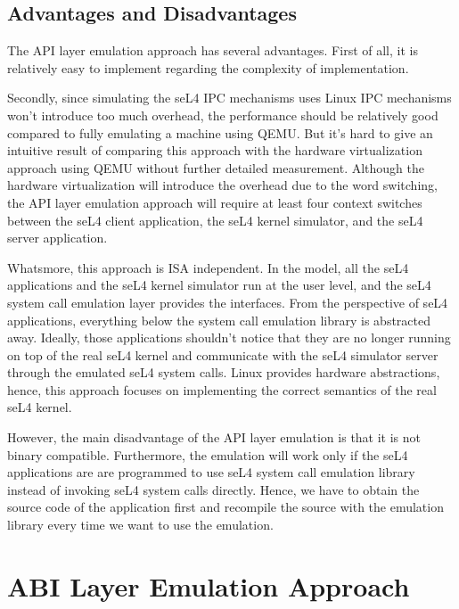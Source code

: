 \subsection{Advantages and Disadvantages}

The API layer emulation approach has several advantages. First of all, it is relatively easy to implement regarding the complexity of implementation.


Secondly, since simulating the seL4 IPC mechanisms uses Linux IPC mechanisms won't introduce too much overhead, the performance should be relatively good compared to fully emulating a machine using QEMU. But it's hard to give an intuitive result of comparing this approach with the hardware virtualization approach using QEMU without further detailed measurement. Although the hardware virtualization will introduce the overhead due to the word switching, the API layer emulation approach will require at least four context switches between the seL4 client application, the seL4 kernel simulator, and the seL4 server application.

Whatsmore, this approach is ISA independent. In the model, all the seL4 applications and the seL4 kernel simulator run at the user level, and the seL4 system call emulation layer provides the interfaces. From the perspective of seL4 applications, everything below the system call emulation library is abstracted away. Ideally, those applications shouldn't notice that they are no longer running on top of the real seL4 kernel and communicate with the seL4 simulator server through the emulated seL4 system calls. Linux provides hardware abstractions, hence, this approach focuses on implementing the correct semantics of the real seL4 kernel.

However, the main disadvantage of the API layer emulation is that it is not binary compatible. Furthermore, the emulation will work only if the seL4 applications are are programmed to use seL4 system call emulation library instead of invoking seL4 system calls directly. Hence, we have to obtain the source code of the application first and recompile the source with the emulation library every time we want to use the emulation.    

\section{ABI Layer Emulation Approach}


